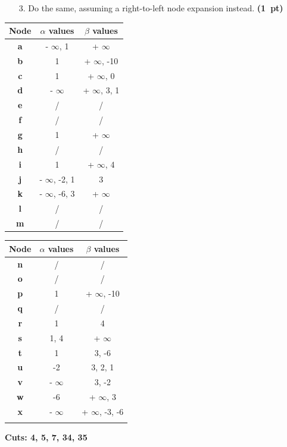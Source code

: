\documentclass[11pt,a4paper]{report}
\begin{document}
\begin{enumerate}
\item[3.] Do the same, assuming a right-to-left node expansion instead.  \textbf{(1~pt)}
\end{enumerate}

\begin{answers}[8cm]
      \begin{multicols}{2}
      \begin{tabular}{ccc}
      Node & $\alpha$ values & $\beta$ values\\
      \hline
      \textbf{a} & - $\infty$, 1 & + $\infty$ \\
      \textbf{b} & 1 & + $\infty$, -10 \\
      \textbf{c} & 1 & + $\infty$, 0 \\
      \textbf{d} & - $\infty$ & + $\infty$, 3, 1 \\
      \textbf{e} & / & / \\
      \textbf{f} & / & / \\
      \textbf{g} & 1 & + $\infty$ \\
      \textbf{h} & / & / \\
      \textbf{i} & 1 & + $\infty$, 4 \\
      \textbf{j} & - $\infty$, -2, 1 & 3 \\
      \textbf{k} & - $\infty$, -6, 3 & + $\infty$ \\
      \textbf{l} & / & / \\
      \textbf{m} & / & / \\ 
      \end{tabular}
      
      \begin{tabular}{ccc}
      Node & $\alpha$ values & $\beta$ values\\
      \hline
      \textbf{n} & / & / \\
      \textbf{o} & / & / \\
      \textbf{p} & 1 & + $\infty$, -10 \\
      \textbf{q} & / & / \\
      \textbf{r} & 1 & 4 \\
      \textbf{s} & 1, 4 & + $\infty$ \\
      \textbf{t} & 1 & 3, -6 \\
      \textbf{u} & -2 & 3, 2, 1 \\
      \textbf{v} & - $\infty$ & 3, -2 \\
      \textbf{w} & -6 & + $\infty$, 3 \\
      \textbf{x} & - $\infty$ & + $\infty$, -3, -6 \\
       &  &  \\
      \end{tabular}
      \end{multicols}
      
\textbf{Cuts: 4, 5, 7, 34, 35}
\end{answers}
\end{document}
